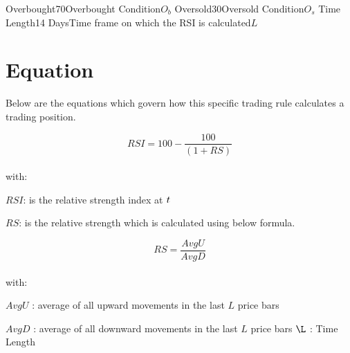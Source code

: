 \documentclass{article}
\begin{document}
\logo
{} %
\tblofcontents

{Overbought}{70}{Overbought Condition}{$O_b$}
{Oversold}{30}{Oversold Condition}{$O_s$}
{Time Length}{14 Days}{Time frame on which the RSI is calculated}{$L$}
\stoptable %


\section{Equation}
Below are the equations which govern how this specific trading rule calculates a trading position.

\begin{equation}
RSI = 100-\frac{100}{(1+RS)}
\end{equation}
\\
with:

$RSI$: is the relative strength index at $t$

$RS$: is the relative strength which is calculated using below formula.

\begin{equation}
RS = \frac{AvgU}{AvgD}
\end{equation}
\\
with:

$AvgU$ : average of all upward movements in the last $L$ price bars

$AvgD$ : average of all downward movements in the last $L$ price bars
$\L$ : Time Length

\keyterms
\furtherlinks %
\end{document}
